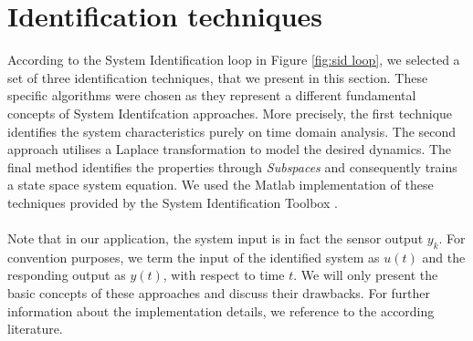 \documentclass[english]{isasthesis}
\begin{document}
    	\section{Identification techniques}
    	According to the System Identification loop in Figure \ref{fig:sid loop}, we selected a set of three identification techniques, that we present in this section. These specific algorithms were chosen as they represent a different fundamental concepts of System Identifcation approaches. More precisely, the first technique identifies the system characteristics purely on time domain analysis. The second approach utilises a Laplace transformation to model the desired dynamics. The final method identifies the properties through \textit{Subspaces} and consequently trains a state space system equation. We used the Matlab implementation of these techniques provided by the System Identification Toolbox \cite{ljung1995system}.\\\\
    	Note that in our application, the system input is in fact the sensor output $y_k$. For convention purposes, we term the input of the identified system as $u(t)$ and the responding output as $y(t)$, with respect to time $t$. We will only present the basic concepts of these approaches and discuss their drawbacks. For further information about the implementation details, we reference to the according literature. 
\end{document}

